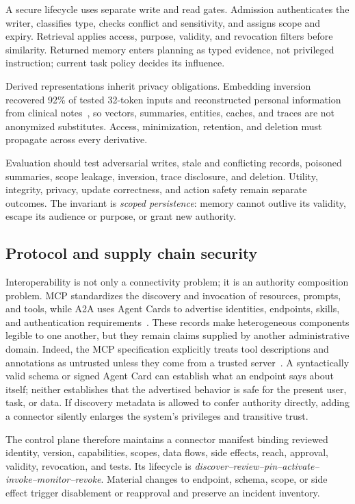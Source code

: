 A secure lifecycle uses separate write and read gates. Admission authenticates the writer, classifies type, checks conflict and sensitivity, and assigns scope and expiry. Retrieval applies access, purpose, validity, and revocation filters before similarity. Returned memory enters planning as typed evidence, not privileged instruction; current task policy decides its influence.

Derived representations inherit privacy obligations. Embedding inversion recovered 92\% of tested 32-token inputs and reconstructed personal information from clinical notes~\cite{morris2023embeddinginversion}, so vectors, summaries, entities, caches, and traces are not anonymized substitutes. Access, minimization, retention, and deletion must propagate across every derivative.

Evaluation should test adversarial writes, stale and conflicting records, poisoned summaries, scope leakage, inversion, trace disclosure, and deletion. Utility, integrity, privacy, update correctness, and action safety remain separate outcomes. The invariant is \emph{scoped persistence}: memory cannot outlive its validity, escape its audience or purpose, or grant new authority.

\subsection{Protocol and supply chain security}

Interoperability is not only a connectivity problem; it is an authority composition problem. MCP standardizes the discovery and invocation of resources, prompts, and tools, while A2A uses Agent Cards to advertise identities, endpoints, skills, and authentication requirements~\cite{mcp2025spec,a2a2026spec}. These records make heterogeneous components legible to one another, but they remain claims supplied by another administrative domain. Indeed, the MCP specification explicitly treats tool descriptions and annotations as untrusted unless they come from a trusted server~\cite{mcp2025spec}. A syntactically valid schema or signed Agent Card can establish what an endpoint says about itself; neither establishes that the advertised behavior is safe for the present user, task, or data. If discovery metadata is allowed to confer authority directly, adding a connector silently enlarges the system's privileges and transitive trust.

The control plane therefore maintains a connector manifest binding reviewed identity, version, capabilities, scopes, data flows, side effects, reach, approval, validity, revocation, and tests. Its lifecycle is \emph{discover--review--pin--activate--invoke--monitor--revoke}. Material changes to endpoint, schema, scope, or side effect trigger disablement or reapproval and preserve an incident inventory.

